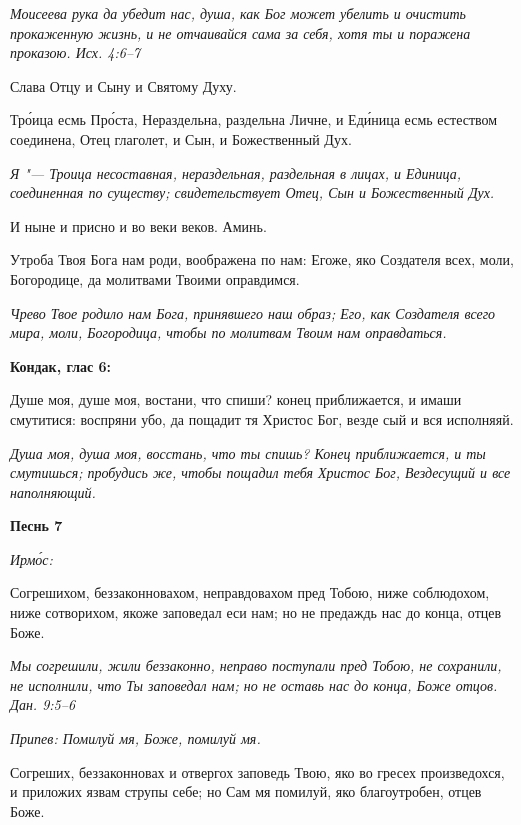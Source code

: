 \itshape Моисеева рука да убедит нас, душа, как Бог может убелить и очистить прокаженную жизнь, и не отчаивайся сама за себя, хотя ты и поражена проказою. Исх. 4:6–7\normalfont{}


Слава Отцу и Сыну и Святому Духу.


Тро́ица есмь Про́ста, Нераздельна, раздельна Личне, и Еди́ница есмь естеством соединена, Отец глаголет, и Сын, и Божественный Дух.


\itshape Я "--- Троица несоставная, нераздельная, раздельная в лицах, и Единица, соединенная по существу; свидетельствует Отец, Сын и Божественный Дух.\normalfont{}


И ныне и присно и во веки веков. Аминь.


Утроба Твоя Бога нам роди, воображена по нам: Егоже, яко Создателя всех, моли, Богородице, да молитвами Твоими оправдимся.


\itshape Чрево Твое родило нам Бога, принявшего наш образ; Его, как Создателя всего мира, моли, Богородица, чтобы по молитвам Твоим нам оправдаться.\normalfont{}





\bfseries Кондак, глас 6:\normalfont{}


Душе моя, душе моя, востани, что спиши? конец приближается, и имаши смутитися: воспряни убо, да пощадит тя Христос Бог, везде сый и вся исполняяй.


\itshape Душа моя, душа моя, восстань, что ты спишь? Конец приближается, и ты смутишься; пробудись же, чтобы пощадил тебя Христос Бог, Вездесущий и все наполняющий.\normalfont{}





\bfseries Песнь 7\normalfont{}


\itshape Ирмо́с:\normalfont{}


Согрешихом, беззаконновахом, неправдовахом пред Тобою, ниже соблюдохом, ниже сотворихом, якоже заповедал еси нам; но не предаждь нас до конца, отцев Боже.


\itshape Мы согрешили, жили беззаконно, неправо поступали пред Тобою, не сохранили, не исполнили, что Ты заповедал нам; но не оставь нас до конца, Боже отцов. Дан. 9:5–6\normalfont{}


\itshape Припев:\normalfont{} Помилуй мя, Боже, помилуй мя.


Согреших, беззаконновах и отвергох заповедь Твою, яко во гресех произведохся, и приложих язвам струпы себе; но Сам мя помилуй, яко благоутробен, отцев Боже.


